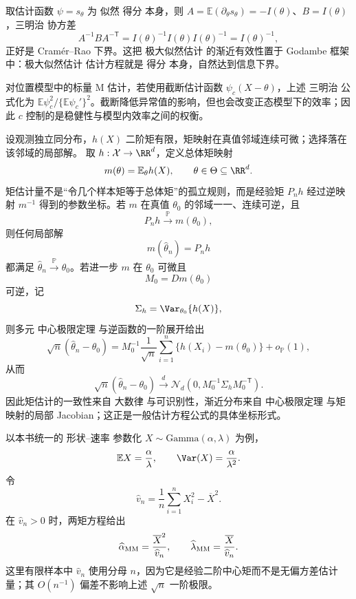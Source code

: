 \begin{workedexample}[得分方程达到信息界]
取估计函数 $\psi=s_\theta$ 为 似然 得分 本身，则 $A=\mathbb E(\partial_\theta s_\theta)=-I(\theta)$、$B=I(\theta)$，三明治 协方差
\[
A^{-1}BA^{-\mathsf T}=I(\theta)^{-1}I(\theta)I(\theta)^{-1}=I(\theta)^{-1},
\]
正好是 Cramér--Rao 下界。这把 极大似然估计 的渐近有效性置于 Godambe 框架中：极大似然估计 估计方程就是 得分 本身，自然达到信息下界。
\end{workedexample}

\begin{note}[截断估计函数的效率]
对位置模型中的标量 M 估计，若使用截断估计函数 $\psi_c(X-\theta)$，上述 三明治 公式化为 $\mathbb E\psi_c^2/\{\mathbb E\psi_c'\}^2$。截断降低异常值的影响，但也会改变正态模型下的效率；因此 $c$ 控制的是稳健性与模型内效率之间的权衡。
\end{note}

\begin{theorem}[矩映射的局部反演]
设观测独立同分布，$h(X)$ 二阶矩有限，矩映射在真值邻域连续可微；选择落在该邻域的局部解。
取 $h:\mathcal X\to\RR^d$，定义总体矩映射
\[
 m(\theta)=\mathbb E_\theta h(X),
 \qquad
 \theta\in\Theta\subseteq\RR^d.
\]
矩估计量不是“令几个样本矩等于总体矩”的孤立规则，而是经验矩 $P_nh$ 经过逆映射 $m^{-1}$ 得到的参数坐标。若 $m$ 在真值 $\theta_0$ 的邻域一一、连续可逆，且
\[
 P_nh\xrightarrow{\mathbb P} m(\theta_0),
\]
则任何局部解
\[
 m(\widehat\theta_n)=P_nh
\]
都满足 $\widehat\theta_n\xrightarrow{\mathbb P}\theta_0$。若进一步 $m$ 在 $\theta_0$ 可微且
\[
 M_0=Dm(\theta_0)
\]
可逆，记
\[
 \Sigma_h=\Var_{\theta_0}\{h(X)\},
\]
则多元 中心极限定理 与逆函数的一阶展开给出
\begin{equation}\label{eq:math-stat-moment-estimator-asymptotic}
 \sqrt n(\widehat\theta_n-\theta_0)
 =M_0^{-1}\frac1{\sqrt n}
 \sum_{i=1}^n\{h(X_i)-m(\theta_0)\}
 +o_{\mathbb P}(1),
\end{equation}
从而
\[
 \sqrt n(\widehat\theta_n-\theta_0)
 \xrightarrow{d}
 \mathcal N_d(0,M_0^{-1}\Sigma_hM_0^{-\mathsf T}).
\]
因此矩估计的一致性来自 大数律 与可识别性，渐近分布来自 中心极限定理 与矩映射的局部 Jacobian；这正是一般估计方程公式的具体坐标形式。
\end{theorem}

\begin{workedexample}
以本书统一的 形状--速率 参数化 $X\sim\mathrm{Gamma}(\alpha,\lambda)$ 为例，
\[
 \mathbb E X=\frac{\alpha}{\lambda},
 \qquad
 \Var(X)=\frac{\alpha}{\lambda^2}.
\]
令
\[
 \widehat v_n
 =\frac1n\sum_{i=1}^nX_i^2-\overline X^2.
\]
在 $\widehat v_n>0$ 时，两矩方程给出
\begin{equation*}\widehat\alpha_{\rm MM}
 =\frac{\overline X^2}{\widehat v_n},
 \qquad
 \widehat\lambda_{\rm MM}
 =\frac{\overline X}{\widehat v_n}.
\end{equation*}
这里有限样本中 $\widehat v_n$ 使用分母 $n$，因为它是经验二阶中心矩而不是无偏方差估计量；其 $O(n^{-1})$ 偏差不影响上述 $\sqrt n$ 一阶极限。
\end{workedexample}

